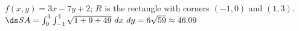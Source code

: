 {$f(x,y) = 3x-7y+2$; $R$ is the rectangle with corners $(-1,0)$ and $(1,3)$.
}
{$\ds SA = \int_{0}^{3}\int_{-1}^{1} \sqrt{1+ 9+49}\ dx\ dy = 6\sqrt{59} \approx 46.09$
}